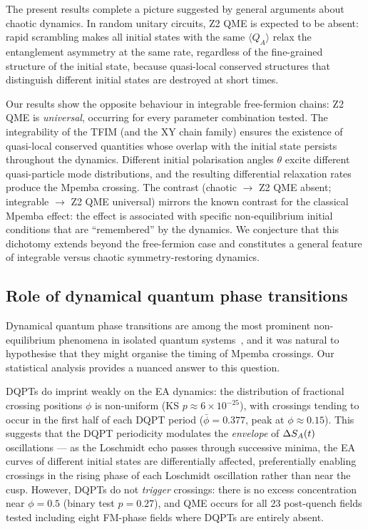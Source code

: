 The present results complete a picture suggested by general arguments about
chaotic dynamics.
In random unitary circuits, Z2 QME is expected to be absent: rapid scrambling
makes all initial states with the same $\langle Q_A\rangle$ relax the entanglement
asymmetry at the same rate, regardless of the fine-grained structure of the initial
state, because quasi-local conserved structures that distinguish different initial
states are destroyed at short times.

Our results show the opposite behaviour in integrable free-fermion chains: Z2 QME
is \emph{universal}, occurring for every parameter combination tested.
The integrability of the TFIM (and the XY chain family) ensures the existence of
quasi-local conserved quantities whose overlap with the initial state persists
throughout the dynamics.
Different initial polarisation angles $\theta$ excite different quasi-particle
mode distributions, and the resulting differential relaxation rates produce the
Mpemba crossing.
The contrast (chaotic $\to$ Z2 QME absent; integrable $\to$ Z2 QME universal)
mirrors the known contrast for the classical Mpemba effect: the effect is associated
with specific non-equilibrium initial conditions that are ``remembered'' by the dynamics.
We conjecture that this dichotomy extends beyond the free-fermion case and constitutes
a general feature of integrable versus chaotic symmetry-restoring dynamics.

\subsection{Role of dynamical quantum phase transitions}
\label{sec:dqpt_role}

Dynamical quantum phase transitions are among the most prominent non-equilibrium
phenomena in isolated quantum systems~\cite{Heyl2018}, and it was natural to hypothesise
that they might organise the timing of Mpemba crossings.
Our statistical analysis provides a nuanced answer to this question.

DQPTs do imprint weakly on the EA dynamics: the distribution of fractional
crossing positions $\phi$ is non-uniform (KS $p \approx 6 \times 10^{-25}$),
with crossings tending to occur in the first half of each DQPT period
($\bar\phi = 0.377$, peak at $\phi \approx 0.15$).
This suggests that the DQPT periodicity modulates the \emph{envelope} of
$\Delta S_A(t)$ oscillations — as the Loschmidt echo passes through successive
minima, the EA curves of different initial states are differentially affected,
preferentially enabling crossings in the rising phase of each Loschmidt oscillation
rather than near the cusp.
However, DQPTs do not \emph{trigger} crossings: there is no excess concentration
near $\phi = 0.5$ (binary test $p = 0.27$), and QME occurs for all 23 post-quench
fields tested including eight FM-phase fields where DQPTs are entirely absent.

